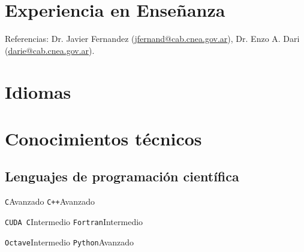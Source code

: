 \documentclass[11pt,a4paper,sans]{moderncv}        %
\begin{document}

\section{Experiencia en Enseñanza}

{Referencias: Dr. Javier Fernandez (\href{mailto:jfernand@cab.cnea.gov.ar}{jfernand@cab.cnea.gov.ar}), Dr. Enzo A. Dari (\href{mailto:darie@cab.cnea.gov.ar}{darie@cab.cnea.gov.ar}).}

\section{Idiomas}



\section{Conocimientos técnicos}

\subsection{Lenguajes de programación científica}

\cvdoubleitem
{\texttt{C}}{Avanzado}
{\texttt{C++}}{Avanzado}

\cvdoubleitem
{\texttt{CUDA C}}{Intermedio}
{\texttt{Fortran}}{Intermedio}

\cvdoubleitem
{\texttt{Octave}}{Intermedio} 
{\texttt{Python}}{Avanzado}
\end{document}
